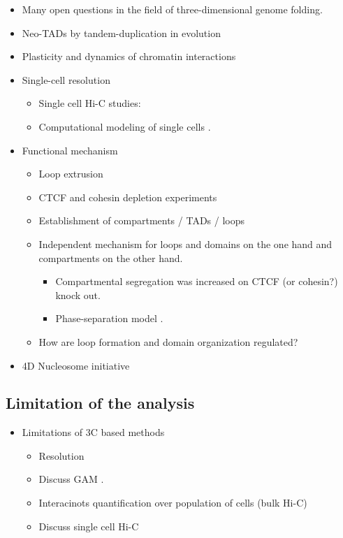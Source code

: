 \documentclass[a4paper,twoside=true,openright,parskip=full,chapterprefix=true,11pt,headings=normal,bibliography=totoc,listof=totoc,titlepage=on,captions=tableabove,draft=false]{scrreprt}
\providecommand{\tightlist}{%
  \setlength{\itemsep}{0pt}\setlength{\parskip}{0pt}}
\theoremstyle{definition}
\theoremstyle{definition}
\theoremstyle{definition}
\theoremstyle{remark}
\begin{document}
\begin{itemize}
\tightlist
\item
  Many open questions in the field of three-dimensional genome folding.
\item
  Neo-TADs by tandem-duplication in evolution \citep{Franke2016}
\item
  Plasticity and dynamics of chromatin interactions
\item
  Single-cell resolution

  \begin{itemize}
  \tightlist
  \item
    Single cell Hi-C studies: \citep{Nagano2017, Stevens2017}
  \item
    Computational modeling of single cells \citep{Sekelja2016}.
  \end{itemize}
\item
  Functional mechanism

  \begin{itemize}
  \tightlist
  \item
    Loop extrusion
  \item
    CTCF and cohesin depletion experiments
  \item
    Establishment of compartments / TADs / loops
  \item
    Independent mechanism for loops and domains on the one hand and
    compartments on the other hand.

    \begin{itemize}
    \tightlist
    \item
      Compartmental segregation was increased on CTCF (or cohesin?)
      knock out.
    \item
      Phase-separation model \citep{DiPierro2017, Strom2017, Hnisz2017}.
    \end{itemize}
  \item
    How are loop formation and domain organization regulated?
  \end{itemize}
\item
  4D Nucleosome initiative
\end{itemize}

\hypertarget{limitation-of-the-analysis}{%
\subsection{Limitation of the
analysis}\label{limitation-of-the-analysis}}

\begin{itemize}
\tightlist
\item
  Limitations of 3C based methods

  \begin{itemize}
  \tightlist
  \item
    Resolution
  \item
    Discuss GAM \citep{Beagrie2017}.
  \item
    Interacinots quantification over population of cells (bulk Hi-C)
  \item
    Discuss single cell Hi-C
  \end{itemize}
\end{itemize}
\end{document}

